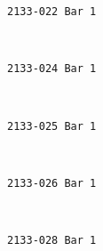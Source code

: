 \documentclass[11pt]{article}
\begin{document}
    \begin{Verbatim}[commandchars=\\\{\}]
2133-022 Bar 1

    \end{Verbatim}

    \begin{center}
    \end{center}
    { \hspace*{\fill} \\}
    
    \begin{Verbatim}[commandchars=\\\{\}]
2133-024 Bar 1

    \end{Verbatim}

    \begin{center}
    \end{center}
    { \hspace*{\fill} \\}
    
    \begin{Verbatim}[commandchars=\\\{\}]
2133-025 Bar 1

    \end{Verbatim}

    \begin{center}
    \end{center}
    { \hspace*{\fill} \\}
    
    \begin{Verbatim}[commandchars=\\\{\}]
2133-026 Bar 1

    \end{Verbatim}

    \begin{center}
    \end{center}
    { \hspace*{\fill} \\}
    
    \begin{Verbatim}[commandchars=\\\{\}]
2133-028 Bar 1

    \end{Verbatim}
\end{document}
